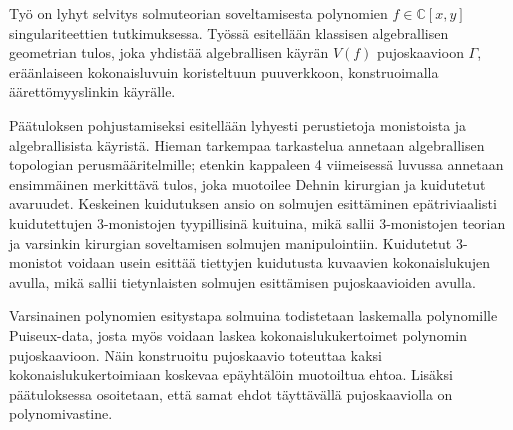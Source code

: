 \documentclass[finnish, 12pt, a4paper, sci, utf8, a-1b, online]{aaltothesis}
\date{31.8.2018 {\color{red}KORJAA OIKEAKSI}}
\theoremstyle{definition}
\theoremstyle{plain}
\theoremstyle{remark}
\newcommand{\C}{\mathbb{C}}
\begin{document}

\pagecolor{aaltoOrange} %
{%

\makecoverpage{}
}
\nopagecolor
{}

\makecopyrightpage{}

\begin{abstractpage}
Työ on lyhyt selvitys solmuteorian soveltamisesta polynomien $f\in\C[x,y]$ singulariteettien tutkimuksessa. Työssä esitellään klassisen algebrallisen geometrian tulos, joka yhdistää algebrallisen käyrän $V(f)$ pujoskaavioon $\Gamma$, eräänlaiseen kokonaisluvuin koristeltuun puuverkkoon, konstruoimalla äärettömyyslinkin käyrälle.

Päätuloksen pohjustamiseksi esitellään lyhyesti perustietoja monistoista ja algebrallisista käyristä. Hieman tarkempaa tarkastelua annetaan algebrallisen topologian perusmääritelmille; etenkin kappaleen 4 viimeisessä luvussa annetaan ensimmäinen merkittävä tulos, joka muotoilee Dehnin kirurgian ja kuidutetut avaruudet. Keskeinen kuidutuksen ansio on solmujen esittäminen epätriviaalisti kuidutettujen 3-monistojen tyypillisinä kuituina, mikä sallii 3-monistojen teorian ja varsinkin kirurgian soveltamisen solmujen manipulointiin. Kuidutetut 3-monistot voidaan usein esittää tiettyjen kuidutusta kuvaavien kokonaislukujen avulla, mikä sallii tietynlaisten solmujen esittämisen pujoskaavioiden avulla.

Varsinainen polynomien esitystapa solmuina todistetaan laskemalla polynomille Puiseux-data, josta myös voidaan laskea kokonaislukukertoimet polynomin pujoskaavioon. Näin konstruoitu pujoskaavio toteuttaa kaksi kokonaislukukertoimiaan koskevaa epäyhtälöin muotoiltua ehtoa. Lisäksi päätuloksessa osoitetaan, että samat ehdot täyttävällä pujoskaaviolla on polynomivastine.
\end{abstractpage}
\end{document}
